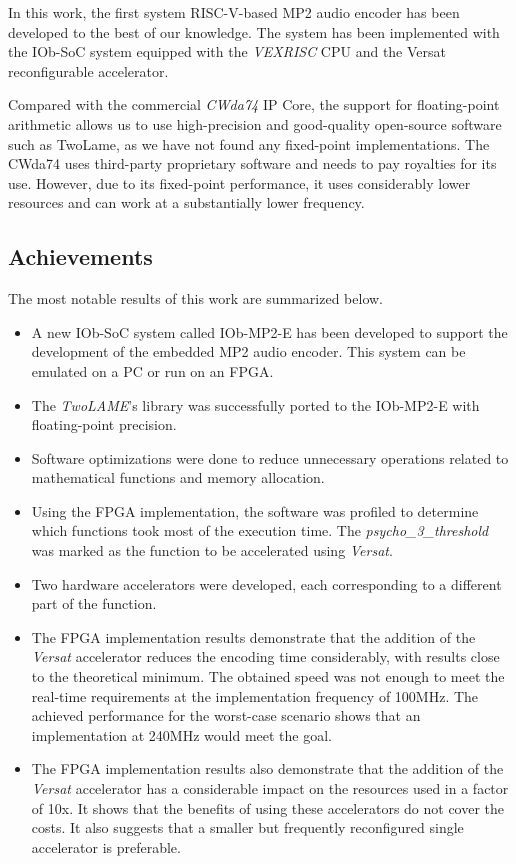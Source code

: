 
In this work, the first system RISC-V-based MP2 audio encoder has been developed to the best of our knowledge. The system has been implemented with the IOb-SoC system equipped with the \textit{VEXRISC} CPU and the Versat reconfigurable accelerator.

Compared with the commercial \textit{CWda74} IP Core, the support for floating-point arithmetic allows us to use high-precision and good-quality open-source software such as TwoLame, as we have not found any fixed-point implementations. The CWda74 uses third-party proprietary software and needs to pay royalties for its use. However, due to its fixed-point performance, it uses considerably lower resources and can work at a substantially lower frequency.


\subsection{Achievements}

The most notable results of this work are summarized below.

\begin{itemize} 

\item A new IOb-SoC system called IOb-MP2-E has been developed to support the development of the embedded MP2 audio encoder. This system can be emulated on a PC or run on an FPGA.

\item The \textit{TwoLAME}'s library was successfully ported to the IOb-MP2-E with floating-point precision.

\item Software optimizations were done to reduce unnecessary operations related to mathematical functions and memory allocation.

\item Using the FPGA implementation, the software was profiled to determine which functions took most of the execution time. The \textit{psycho\_3\_threshold} was marked as the function to be accelerated using \textit{Versat}.

\item Two hardware accelerators were developed, each corresponding to a different part of the function.

\item The FPGA implementation results demonstrate that the addition of the \textit{Versat} accelerator reduces the encoding time considerably, with results close to the theoretical minimum. The obtained speed was not enough to meet the real-time requirements at the implementation frequency of 100MHz. The achieved performance for the worst-case scenario shows that an implementation at 240MHz would meet the goal.

\item The FPGA implementation results also demonstrate that the addition of the \textit{Versat} accelerator has a considerable impact on the resources used in a factor of 10x. It shows that the benefits of using these accelerators do not cover the costs. It also suggests that a smaller but frequently reconfigured single accelerator is preferable.

\end{itemize} 

